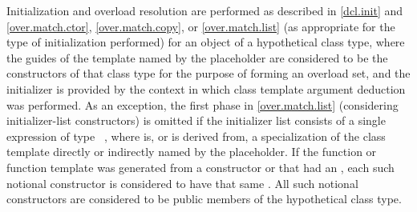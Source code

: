 \pnum
Initialization and overload resolution are performed as described
in \ref{dcl.init} and \ref{over.match.ctor}, \ref{over.match.copy},
or \ref{over.match.list} (as appropriate for the type of initialization
performed) for an object of a hypothetical class type, where
the guides of the template named by the placeholder are considered to be the
constructors of that class type for the purpose of forming an overload
set, and the initializer is provided by the context in which class
template argument deduction was performed.
As an exception, the first phase in \ref{over.match.list}
(considering initializer-list constructors)
is omitted if the initializer list consists of
a single expression of type \cv{}~,
where  is, or is derived from,
a specialization of the class template
directly or indirectly named by the placeholder.
If the function or function template was generated from
a constructor or 
that had an ,
each such notional constructor is considered to have
that same .
All such notional constructors are considered to be
public members of the hypothetical class type.

